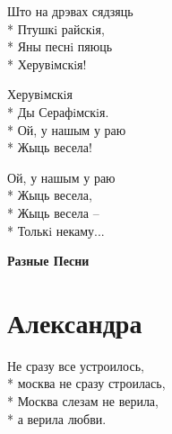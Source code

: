 \begin{minipage}{\linewidth}
Што на дрэвах сядзяць\\*
Птушкi райскiя,\\*
Яны песнi пяюць\\*
Херувiмскiя!\\
\end{minipage}\par\medskip\nobreak

\medskip

\begin{minipage}{\linewidth}
Херувiмскiя\\*
Ды Серафiмскiя.\\*
Ой, у нашым у раю\\*
Жыць весела!\\
\end{minipage}\par\medskip\nobreak

\medskip

\begin{minipage}{\linewidth}
Ой, у нашым у раю\\*
Жыць весела,\\*
Жыць весела –\\*
Толькi некаму...\\
\end{minipage}

\vspace{\fill}\newpage

\cleardoublepage
\thispagestyle{empty}
\vspace*{\fill}
{\centering\huge\bfseries Разные Песни\par}
\vspace*{\fill}
\newpage
\section{Александра}
\label{song:Александра}

\medskip

\begin{minipage}{\linewidth}
Не сразу все устроилось,\\*
москва не сразу строилась,\\*
Москва слезам не верила,\\*
а верила любви.\\
\end{minipage}\par\medskip\nobreak

